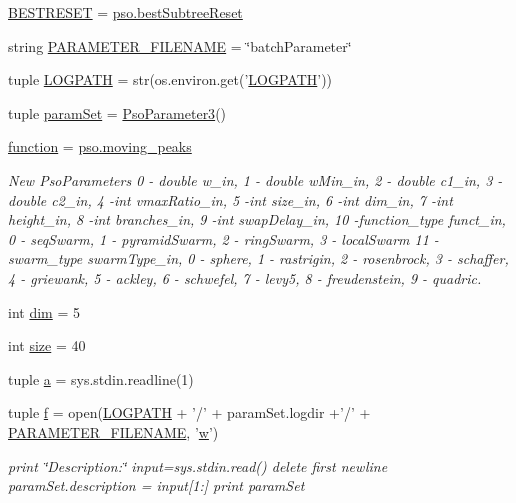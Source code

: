 \begin{CompactItemize}
\item 
\hyperlink{namespacewriteBatch_3b9f2d6ffe2bbdf3f80166c39f82773c}{BESTRESET} = \hyperlink{namespacepso_2211a1f30d45c28cceff06417420201c}{pso.bestSubtreeReset}
\item 
string \hyperlink{namespacewriteBatch_003da176dfacfb835c1e9133cdb37f8e}{PARAMETER\_\-FILENAME} = \char`\"{}batchParameter\char`\"{}
\item 
tuple \hyperlink{namespacewriteBatch_a3616d516a898f90ab8b4547ab334023}{LOGPATH} = str(os.environ.get('\hyperlink{namespacewriteBatch_a3616d516a898f90ab8b4547ab334023}{LOGPATH}'))
\item 
tuple \hyperlink{namespacewriteBatch_07e3eaa2887f04bd6d635e9e76aade01}{paramSet} = \hyperlink{classpsoParameter_1_1PsoParameter3}{PsoParameter3}()
\item 
\hyperlink{namespacewriteBatch_e7d20431673b44f9a24a312852f90f95}{function} = \hyperlink{namespacepso_4a103e716c29578270c431d7bfc1bb42}{pso.moving\_\-peaks}
\begin{CompactList}\small\item\em New PsoParameters 0 - double w\_\-in, 1 - double wMin\_\-in, 2 - double c1\_\-in, 3 - double c2\_\-in, 4 -int vmaxRatio\_\-in, 5 -int size\_\-in, 6 -int dim\_\-in, 7 -int height\_\-in, 8 -int branches\_\-in, 9 -int swapDelay\_\-in, 10 -function\_\-type funct\_\-in, 0 - seqSwarm, 1 - pyramidSwarm, 2 - ringSwarm, 3 - localSwarm 11 -swarm\_\-type swarmType\_\-in, 0 - sphere, 1 - rastrigin, 2 - rosenbrock, 3 - schaffer, 4 - griewank, 5 - ackley, 6 - schwefel, 7 - levy5, 8 - freudenstein, 9 - quadric. \item\end{CompactList}\item 
int \hyperlink{namespacewriteBatch_497c37cea4733fbbe789cebd0d9e16fa}{dim} = 5
\item 
int \hyperlink{namespacewriteBatch_5e5c460c662df35cd814d849d711ac46}{size} = 40
\item 
tuple \hyperlink{namespacewriteBatch_c2c17fe84bec49456afa091013ebcc31}{a} = sys.stdin.readline(1)
\item 
tuple \hyperlink{namespacewriteBatch_382374a7f7c4784df8be182d7eee7b19}{f} = open(\hyperlink{namespacewriteBatch_a3616d516a898f90ab8b4547ab334023}{LOGPATH} + '/' + paramSet.logdir +'/' + \hyperlink{namespacewriteBatch_003da176dfacfb835c1e9133cdb37f8e}{PARAMETER\_\-FILENAME}, '\hyperlink{runpso_8cpp_fb3248bab1c7ee0ad97e9d4c275b4c67}{w}')
\begin{CompactList}\small\item\em print \char`\"{}Description:\char`\"{} input=sys.stdin.read() delete first newline paramSet.description = input\mbox{[}1:\mbox{]} print paramSet \item\end{CompactList}\end{CompactItemize}


